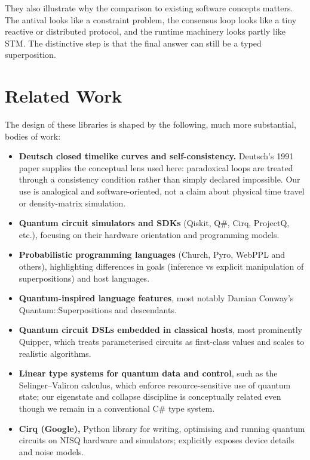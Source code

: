 \documentclass[a4paper,11pt]{article}
\begin{document}
They also illustrate why the comparison to existing software concepts matters.
The antival looks like a constraint problem, the consensus loop looks like a tiny
reactive or distributed protocol, and the runtime machinery looks partly like STM.
The distinctive step is that the final answer can still be a typed superposition.

\section{Related Work}

The design of these libraries is shaped by the following, much more substantial, bodies of work:

\begin{itemize}
\item
  \textbf{Deutsch closed timelike curves and self-consistency.}
  Deutsch's 1991 paper supplies the conceptual lens used here: paradoxical loops
  are treated through a consistency condition rather than simply declared impossible.
  Our use is analogical and software-oriented, not a claim about physical time travel
  or density-matrix simulation.\parencite{Deutsch91CTC}
\item
  \textbf{Quantum circuit simulators and SDKs} (Qiskit, Q\#, Cirq, ProjectQ, etc.), focusing on their hardware orientation and programming models.\parencite{pyp25,Heim18QSharp,Steiger16ProjectQ}
\item
  \textbf{Probabilistic programming languages} (Church, Pyro, WebPPL and others), highlighting differences in goals (inference vs explicit manipulation of superpositions) and host languages.\parencite{Church2008,Goo19,Goodman14WebPPL}
\item
  \textbf{Quantum-inspired language features}, most notably Damian Conway's Quantum::Superpositions and descendants.\parencite{Dam25}
\item
  \textbf{Quantum circuit DSLs embedded in classical hosts}, most prominently Quipper, which treats parameterised circuits as first-class values and scales to realistic algorithms.\parencite{Green13Quipper}
\item
  \textbf{Linear type systems for quantum data and control}, such as the Selinger–Valiron calculus, which enforce resource-sensitive use of quantum state; our eigenstate and collapse discipline is conceptually related even though we remain in a conventional C\# type system.\parencite{SelingerValiron10}
\item
  \textbf{Cirq (Google),} Python library for writing, optimising and running quantum circuits on NISQ hardware and simulators; explicitly exposes device details and noise models.\parencite{Goo25}

\end{itemize}
\end{document}
